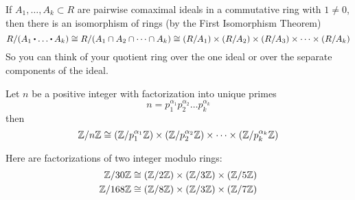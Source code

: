 \documentclass[../Main.tex]{subfiles}
\begin{document}
\begin{crl}[title= Isomorphisms of quotient rings by product of ideals]
	If $A_1,\dots,A_k\subset R$ are pairwise comaximal ideals in a commutative ring with $1\ne 0$, then there is an isomorphism of rings (by the First Isomorphism Theorem)
	\[R/(A_1\rdot \dots\rdot A_k)\cong R/(A_1\cap A_2\cap \dots \cap A_k) \cong (R/A_1)\times (R/A_2)\times (R/A_3)\times\dots\times(R/A_k)\]
	So you can think of your quotient ring over the one ideal or over the separate components of the ideal.
\end{crl}
\begin{crl}[title = \texorpdfstring{$\modZ{n}$}{TEXT} isomorphic to quotients by prime factors]
	Let $n$ be a positive integer with factorization into unique primes \[n=p_1^{\alpha_1} p_2^{\alpha_2}\dots p_k^{\alpha_k}\]
	then
	\[\mathbb{Z}/n\mathbb{Z} \cong (\mathbb{Z}/p_1^{\alpha_1}\mathbb{Z})\times (\mathbb{Z}/p_2^{\alpha_2}\mathbb{Z})\times \dots \times (\mathbb{Z}/p_k^{\alpha_k}\mathbb{Z})\]
\end{crl}
\begin{example} Here are factorizations of two integer modulo rings:
	\begin{align*}
	\mathbb{Z}/30\mathbb{Z}&\cong (\mathbb{Z}/2\mathbb{Z})\times(\mathbb{Z}/3\mathbb{Z})\times(\mathbb{Z}/5\mathbb{Z})\\
	\mathbb{Z}/168\mathbb{Z}&\cong (\mathbb{Z}/8\mathbb{Z})\times(\mathbb{Z}/3\mathbb{Z})\times(\mathbb{Z}/7\mathbb{Z})
	\end{align*}
\end{example}
\end{document}
